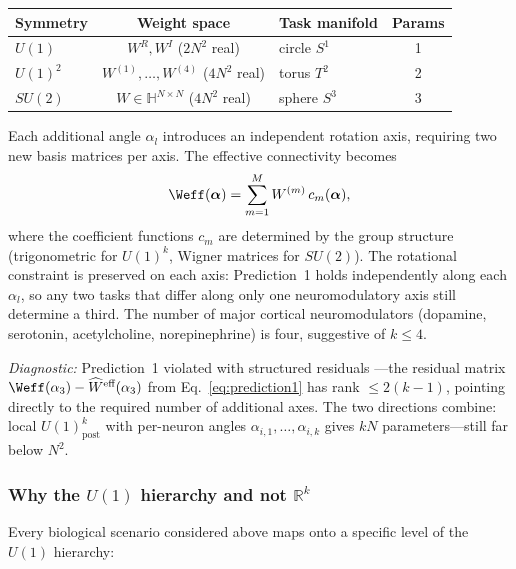 \documentclass[11pt]{article}
\begin{document}
\begin{center}
\renewcommand{\arraystretch}{1.3}
\begin{tabular}{@{}lclc@{}}
\toprule
\textbf{Symmetry} & \textbf{Weight space} & 
\textbf{Task manifold} & \textbf{Params} \\
\midrule
$U(1)$ & $W^R, W^I$ ($2N^2$ real) & circle $S^1$ & 1 \\
$U(1)^2$ & $W^{(1)}, \ldots, W^{(4)}$ ($4N^2$ real) & 
torus $T^2$ & 2 \\
$SU(2)$ & $W \in \mathbb{H}^{N\times N}$ ($4N^2$ real) & 
sphere $S^3$ & 3 \\
\bottomrule
\end{tabular}
\end{center}

Each additional angle $\alpha_l$ introduces an independent rotation 
axis, requiring two new basis matrices per axis. The effective 
connectivity becomes
\begin{equation}
\Weff(\boldsymbol{\alpha}) = \sum_{m=1}^{M} W^{(m)}\, 
c_m(\boldsymbol{\alpha}),
\end{equation}
where the coefficient functions $c_m$ are determined by the group 
structure (trigonometric for $U(1)^k$, Wigner matrices for $SU(2)$). 
The rotational constraint is preserved on each axis: Prediction~1 
holds independently along each $\alpha_l$, so any two tasks that 
differ along only one neuromodulatory axis still determine a third. 
The number of major cortical neuromodulators (dopamine, serotonin, 
acetylcholine, norepinephrine) is four, suggestive of $k \leq 4$.

\emph{Diagnostic:} Prediction~1 violated with structured residuals 
---the residual matrix $\Weff(\alpha_3) - 
\widehat{W}^{\text{eff}}(\alpha_3)$ from 
Eq.~\eqref{eq:prediction1} has rank $\leq 2(k-1)$, pointing 
directly to the required number of additional axes. The two directions combine: local $U(1)_{\text{post}}^k$ with 
per-neuron angles $\alpha_{i,1}, \ldots, \alpha_{i,k}$ gives $kN$ 
parameters---still far below $N^2$.

\subsubsection{Why the $U(1)$ hierarchy and not $\mathbb{R}^k$}
\label{sec:why_hierarchy}

Every biological scenario considered above maps onto a specific 
level of the $U(1)$ hierarchy:
\end{document}

